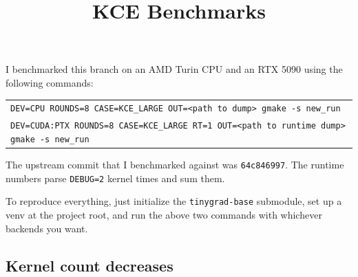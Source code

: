 \documentclass[10pt,letterpaper]{article}
\title{KCE Benchmarks}
\author{}
\date{\vspace{-5em}}
\begin{document}
\newlength{\wvA}
\newlength{\wvB}
\newlength{\wvC}
\newlength{\wvD}
\newlength{\wvE}
\newlength{\wvF}
\newlength{\wvG}
\newlength{\wpct}
\newlength{\wcase}
\maketitle
\thispagestyle{empty}

I benchmarked this branch on an AMD Turin CPU and an RTX 5090 using the following commands:

\begin{tabular}{@{}l@{}}
\texttt{DEV=CPU ROUNDS=8 CASE=KCE\_LARGE OUT=<path to dump> gmake -s new\_run} \\
\texttt{DEV=CUDA:PTX ROUNDS=8 CASE=KCE\_LARGE RT=1 OUT=<path to runtime dump> gmake -s new\_run} \\
\end{tabular}

The upstream commit that I benchmarked against was \texttt{64c846997}. The runtime numbers parse \texttt{DEBUG=2} kernel times and sum them.

To reproduce everything, just initialize the \texttt{tinygrad-base} submodule, set up a venv at the project root, and run the above two commands with whichever backends you want.

\subsection*{Kernel count decreases}
\end{document}
